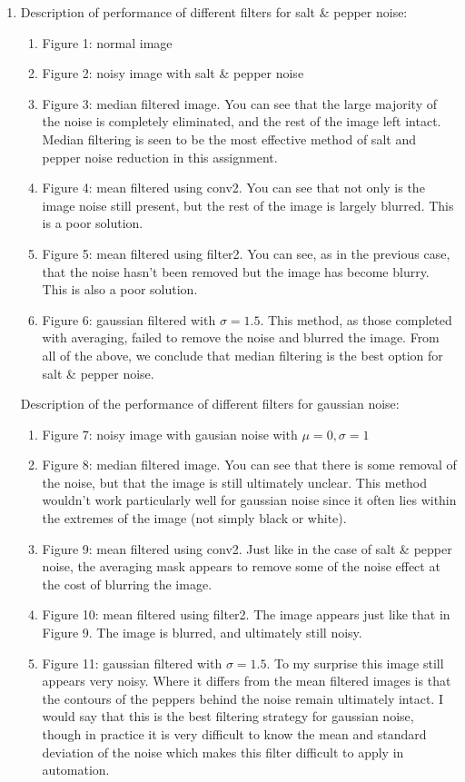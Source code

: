 \documentclass[10pt]{article}
\begin{document}
\begin{enumerate}
\begin{enumerate}
\item Description of performance of different filters for salt \& pepper noise:
\begin{enumerate}
\item Figure 1: normal image
\item Figure 2: noisy image with salt \& pepper noise
\item Figure 3: median filtered image. You can see that the large majority of the noise is completely eliminated, and the rest of the image left intact. Median filtering is seen to be the most effective method of salt and pepper noise reduction in this assignment.
\item Figure 4: mean filtered using conv2. You can see that not only is the image noise still present, but the rest of the image is largely blurred. This is a poor solution.
\item Figure 5: mean filtered using filter2. You can see, as in the previous case, that the noise hasn't been removed but the image has become blurry. This is also a poor solution.
\item Figure 6: gaussian filtered with $\sigma=1.5$. This method, as those completed with averaging, failed to remove the noise and blurred the image. From all of the above, we conclude that median filtering is the best option for salt \& pepper noise.
\end{enumerate}

Description of the performance of different filters for gaussian noise:
\begin{enumerate}
\item Figure 7: noisy image with gausian noise with $\mu = 0 , \sigma = 1$
\item Figure 8: median filtered image. You can see that there is some removal of the noise, but that the image is still ultimately unclear. This method wouldn't work particularly well for gaussian noise since it often lies within the extremes of the image (not simply black or white).
\item Figure 9: mean filtered using conv2. Just like in the case of salt \& pepper noise, the averaging mask appears to remove some of the noise effect at the cost of blurring the image.
\item Figure 10: mean filtered using filter2. The image appears just like that in Figure 9. The image is blurred, and ultimately still noisy.
\item Figure 11: gaussian filtered with $\sigma = 1.5$. To my surprise this image still appears very noisy. Where it differs from the mean filtered images is that the contours of the peppers behind the noise remain ultimately intact. I would say that this is the best filtering strategy for gaussian noise, though in practice it is very difficult to know the mean and standard deviation of the noise which makes this filter difficult to apply in automation.
\end{enumerate}


\end{enumerate}
\end{enumerate}
\end{document}

